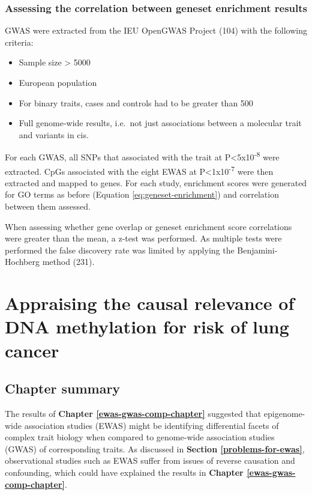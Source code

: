 \documentclass[11pt,twoside]{bristolthesis}
\providecommand{\tightlist}{%
  \setlength{\itemsep}{0pt}\setlength{\parskip}{0pt}}
\begin{document}
\hypertarget{assessing-the-correlation-between-geneset-enrichment-results}{%
\subsection{Assessing the correlation between geneset enrichment results}\label{assessing-the-correlation-between-geneset-enrichment-results}}

GWAS were extracted from the IEU OpenGWAS Project (104) with the following criteria:
\begin{itemize}
\tightlist
\item
  Sample size \textgreater{} 5000
\item
  European population
\item
  For binary traits, cases and controls had to be greater than 500
\item
  Full genome-wide results, i.e.~not just associations between a molecular trait and variants in cis.
\end{itemize}
For each GWAS, all SNPs that associated with the trait at P\textless5x10\textsuperscript{-8} were extracted. CpGs associated with the eight EWAS at P\textless1x10\textsuperscript{-7} were then extracted and mapped to genes. For each study, enrichment scores were generated for GO terms as before (Equation \eqref{eq:geneset-enrichment}) and correlation between them assessed.

When assessing whether gene overlap or geneset enrichment score correlations were greater than the mean, a z-test was performed. As multiple tests were performed the false discovery rate was limited by applying the Benjamini-Hochberg method (231).

\hypertarget{dnam-lung-cancer-mr}{%
\chapter{Appraising the causal relevance of DNA methylation for risk of lung cancer}\label{dnam-lung-cancer-mr}}

\hypertarget{chapter-summary-07}{%
\section{Chapter summary}\label{chapter-summary-07}}

The results of \textbf{Chapter \ref{ewas-gwas-comp-chapter}} suggested that epigenome-wide association studies (EWAS) might be identifying differential facets of complex trait biology when compared to genome-wide association studies (GWAS) of corresponding traits. As discussed in \textbf{Section \ref{problems-for-ewas}}, observational studies such as EWAS suffer from issues of reverse causation and confounding, which could have explained the results in \textbf{Chapter \ref{ewas-gwas-comp-chapter}}.
\end{document}
